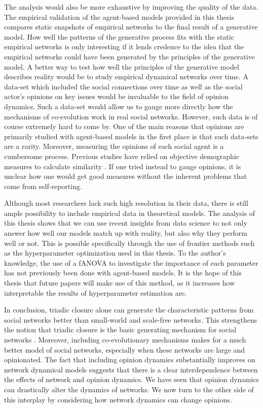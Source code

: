 \documentclass[11pt]{article}
\begin{document}
The analysis would also be more exhaustive by improving the quality of the data. The empirical validation of the agent-based models provided in this thesis compares static snapshots of empirical networks to the final result of a generative model. How well the patterns of the generative process fits with the static empirical networks is only interesting if it lends credence to the idea that the empirical networks could have been generated by the principles of the generative model. 
A better way to test how well the principles of the generative model describes reality would be to study empirical dynamical networks over time. A data-set which included the social connections over time as well as the social actor's opinions on key issues would be invaluable to the field of opinion dynamics. Such a data-set would allow us to gauge more directly how the mechanisms of co-evolution work in real social networks. 
However, such data is of course extremely hard to come by. One of the main reasons that opinions are primarily studied with agent-based models in the first place is that such data-sets are a rarity. Moreover, measuring the opinions of each social agent is a cumbersome process. Previous studies have relied on objective demographic measures to calculate similarity \cite{kossinets_origins_2009, bener_empirical_2016}. If one tried instead to gauge opinions, it is unclear how one would get good measures without the inherent problems that come from self-reporting. 

Although most researchers lack such high resolution in their data, there is still ample possibility to include empirical data in theoretical models. 
The analysis of this thesis shows that we can use recent insights from data science to not only answer how well our models match up with reality, but also why they perform well or not. 
This is possible specifically through the use of frontier methods such as the hyperparameter optimization used in this thesis. To the author's knowledge, the use of a fANOVA to investigate the importance of each parameter has not previously been done with agent-based models.
It is the hope of this thesis that future papers will make use of this method, as it increases how  interpretable the results of hyperparameter estimation are.

In conclusion, triadic closure alone can generate the characteristic patterns from social networks better than small-world and scale-free networks. This strengthens the notion that triadic closure is the basic generating mechanism for social networks \cite{ilany_social_2016,jackson_meeting_2007, jackson_search_2004}. Moreover, including co-evolutionary mechanisms makes for a much better model of social networks, especially when these networks are large and opinionated. 
The fact that including opinion dynamics substantially improves on network dynamical models suggests that there is a clear interdependence between the effects of network and opinion dynamics. We have seen that opinion dynamics can drastically alter the dynamics of networks. We now turn to the other side of this interplay by considering how network dynamics can change opinions.
\end{document}

